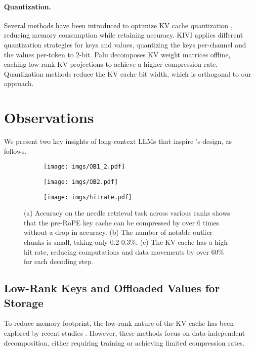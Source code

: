 \paragraph{Quantization.} Several methods have been introduced to optimize KV cache quantization \citep{hooper2024kvquant, yue2024wkvquant, xiao2023smoothquant}, reducing memory consumption while retaining accuracy. KIVI \citep{liu2024kivi} applies different quantization strategies for keys and values, quantizing the keys per-channel and the values per-token to 2-bit. Palu \citep{chang2024palu} decomposes KV weight matrices offline, caching low-rank KV projections to achieve a higher compression rate. Quantization methods reduce the KV cache bit width, which is orthogonal to our approach.
\section{Observations}
\label{sec:observation}
We present two key insights of long-context LLMs that inspire \Sys's design, as follows.
\begin{figure}[t]
    \centering
    \begin{subfigure}[b]{0.32\textwidth}
        \texttt{[image: imgs/OB1\_2.pdf]}
        \caption{}
        \label{fig:OB1_2}
    \end{subfigure}
    \hfill
    \begin{subfigure}[b]{0.32\textwidth}
        \texttt{[image: imgs/OB2.pdf]}
        \caption{}
        \label{fig:OB2}
   \end{subfigure}
       \begin{subfigure}[b]{0.32\textwidth}
        \texttt{[image: imgs/hitrate.pdf]}
        \caption{}
        \label{fig:hitrate}
   \end{subfigure}
    \caption{(a) Accuracy on the needle retrieval task across various ranks shows that the pre-RoPE key cache can be compressed by over 6 times without a drop in accuracy.  (b) The number of notable outlier chunks is small, taking only 0.2-0.3\%. (c) The KV cache has a high hit rate, reducing computations and data movements by over 60\% for each decoding step.}
    \label{fig:observation}
\end{figure}

\subsection{Low-Rank Keys and Offloaded Values for Storage}
\label{sec:lr_compression}
To reduce memory footprint, the low-rank nature of the KV cache has been explored by recent studies \citep{deepseekv2, xu2024think, chang2024palu}. However, these methods focus on data-independent decomposition, either requiring training or achieving limited compression rates.


